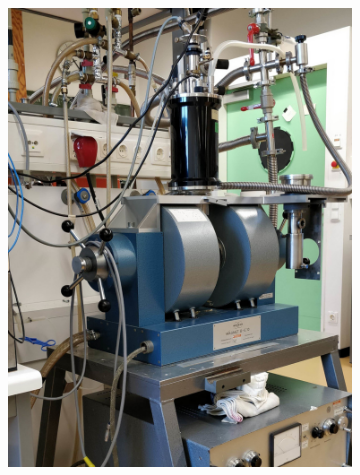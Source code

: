 \documentclass[11pt,a4paper]{article}
\begin{document}
\begin{figure}[H]
\centering
\begin{subfigure}[b]{0.4\textwidth}
\includegraphics[width=\textwidth]{Experimental_setup}
\caption{}
\label{fig:experimental_setup}
\end{subfigure}
\begin{subfigure}[b]{0.4\textwidth}

\end{subfigure}
\end{figure}
\end{document}
